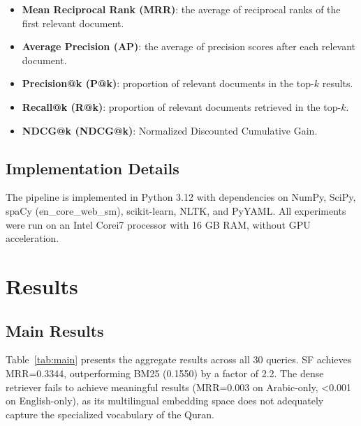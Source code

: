 \documentclass[conference]{IEEEtran}
\begin{document}
\begin{itemize}
  \item \textbf{Mean Reciprocal Rank (MRR)}: the average of reciprocal
        ranks of the first relevant document.
  \item \textbf{Average Precision (AP)}: the average of precision scores
        after each relevant document.
  \item \textbf{Precision@k (P@k)}: proportion of relevant documents
        in the top-$k$ results.
  \item \textbf{Recall@k (R@k)}: proportion of relevant documents
        retrieved in the top-$k$.
  \item \textbf{NDCG@k (NDCG@k)}: Normalized Discounted Cumulative Gain.
\end{itemize}

\subsection{Implementation Details}

The pipeline is implemented in Python 3.12 with dependencies on
NumPy, SciPy, spaCy (en\_core\_web\_sm), scikit-learn, NLTK, and
PyYAML. All experiments were run on an Intel\textregistered
Core\texttrademark i7 processor with 16 GB RAM, without GPU
acceleration.

\section{Results}

\subsection{Main Results}

Table~\ref{tab:main} presents the aggregate results across all 30
queries. SF achieves MRR=0.3344, outperforming BM25 (0.1550) by a factor
of 2.2. The dense retriever fails to achieve meaningful results
(MRR=0.003 on Arabic-only, <0.001 on English-only), as its multilingual
embedding space does not adequately capture the specialized vocabulary
of the Quran.
\end{document}
